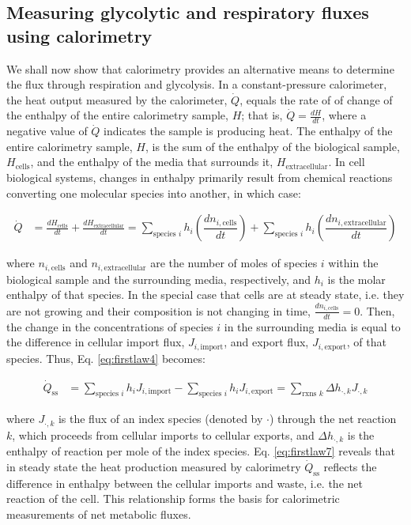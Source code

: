 \documentclass{compactarticle}
\begin{document}
\subsection{Measuring glycolytic and respiratory fluxes using calorimetry
\label{sec:calorimetry}}

We shall now show that calorimetry provides an alternative means to determine the flux through respiration and glycolysis. In a constant-pressure calorimeter, the heat output measured by the calorimeter, $\dot{Q}$, equals the rate of of change of the enthalpy of the entire calorimetry sample, $H$; that is, $ \dot{Q} = \frac{dH}{dt}$, where a negative value of $\dot{Q}$ indicates the sample is producing heat. The enthalpy of the entire calorimetry sample, $H$, is the sum of the enthalpy of the biological sample, $H_\text{cells}$, and the enthalpy of the media that surrounds it, $ H_\text{extracellular} $. In cell biological systems, changes in enthalpy primarily result from chemical reactions converting one molecular species into another, in which case:

\begin{align}
    \dot{Q} &= \frac{dH_\text{cells}}{dt} + \frac{dH_\text{extracellular}}{dt} = \sum_{\text{species } i}  h_i \left( \dfrac{dn_{i,\text{cells}}}{dt} \right) + \sum_{\text{species } i}  h_i \left( \dfrac{dn_{i,\text{extracellular}}}{dt} \right)
    \label{eq:firstlaw4}
\end{align}

\noindent where $n_{i,\text{cells}}$ and $n_{i,\text{extracellular}}$ are the number of moles of species $i$ within the biological sample and the surrounding media, respectively, and $h_i$ is the molar enthalpy of that species. In the special case that cells are at steady state, i.e. they are not growing and their composition is not changing in time, $\frac{dn_{i,\text{cells}}}{dt} = 0$. Then, the change in the concentrations of species $i$ in the surrounding media is equal to the difference in cellular import flux, $J_{i,\text{import}}$, and export flux, $J_{i,\text{export}}$, of that species. Thus, Eq. \ref{eq:firstlaw4} becomes:

\begin{align}
    \dot{Q}_\text{ss} &= \sum_{\text{species } i}  h_i J_{i,\text{import}} - \sum_{\text{species } i}  h_i J_{i,\text{export}} = \sum_{\text{rxns } k} \Delta h_{\cdot,k} J_{\cdot,k}
    \label{eq:firstlaw7}
\end{align}

\noindent where $ J_{\cdot,k} $ is the flux of an index species (denoted by $ \cdot $) through the net reaction $ k $, which proceeds from cellular imports to cellular exports, and $ \Delta h_{\cdot,k} $ is the enthalpy of reaction per mole of the index species. Eq. \ref{eq:firstlaw7} reveals that in steady state the heat production measured by calorimetry $\dot{Q}_\text{ss}$ reflects the difference in enthalpy between the cellular imports and waste, i.e. the net reaction of the cell. This relationship forms the basis for calorimetric measurements of net metabolic fluxes.
\end{document}
